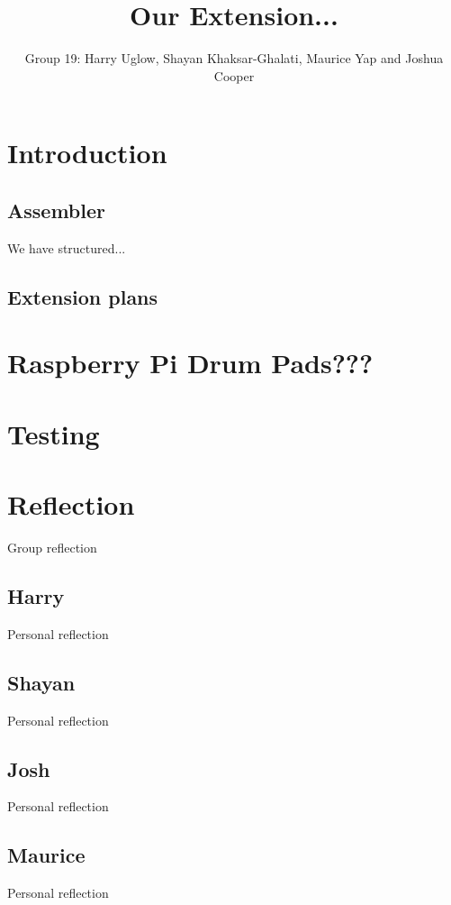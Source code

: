 \documentclass[11pt]{article}
\begin{document}
\title{Our Extension...}
\author{Group 19: Harry Uglow, Shayan Khaksar-Ghalati, Maurice Yap and Joshua Cooper}

\maketitle

\section{Introduction}

\subsection{Assembler}

We have structured...

\subsection{Extension plans}

\section{Raspberry Pi Drum Pads???}

\section{Testing}

\section{Reflection}
Group reflection

\subsection{Harry}
Personal reflection

\subsection{Shayan}
Personal reflection

\subsection{Josh}
Personal reflection

\subsection{Maurice}
Personal reflection
\end{document}
